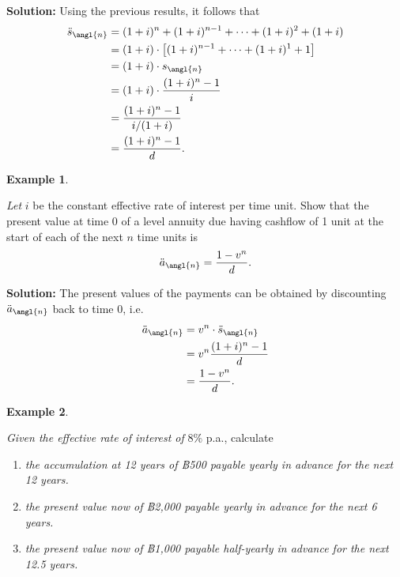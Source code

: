 \documentclass[
]{book}
\theoremstyle{definition}
\theoremstyle{definition}
\newtheorem{example}{Example}[chapter]
\theoremstyle{definition}
\theoremstyle{definition}
\theoremstyle{remark}
\begin{document}
\textbf{Solution:} Using the previous results, it follows that
\[\begin{aligned}
 \ddot{s}_\angl{n} &= (1+i)^n + (1+i)^{n-1} + \cdots + (1+i)^2 + (1+i) \\
            &= (1+i) \cdot \left[(1+i)^{n-1} + \cdots + (1+i)^1 + 1\right] \\
            &= (1+i) \cdot {s}_\angl{n} \\
            &= (1+i) \cdot \frac{(1+i)^n -1 }{i}\\
            &=  \frac{(1+i)^n -1 }{i/(1+i)}\\
            &=  \frac{(1+i)^n -1 }{d}.\end{aligned}\]

\begin{example}
\protect\hypertarget{exm:unlabeled-div-31}{}\label{exm:unlabeled-div-31}

\emph{Let} \(i\) be the constant effective rate of interest per time unit. Show
that the present value at time 0 of a level annuity due having cashflow
of 1 unit at the start of each of the next \(n\) time units is
\[\ddot{a}_\angl{n} =  \frac{1 - v^n }{d}.\]

\end{example}

\textbf{Solution:} The present values of the payments can be obtained by
discounting \(\ddot{a}_\angl{n}\) back to time 0, i.e.~\[\begin{aligned}
 \ddot{a}_\angl{n} &= v^n  \cdot  \ddot{s}_\angl{n} \\
            &= v^n  \frac{(1+i)^n -1 }{d} \\
            &=\frac{1 - v^n}{d}.\end{aligned}\]

\begin{example}
\protect\hypertarget{exm:unlabeled-div-32}{}\label{exm:unlabeled-div-32}

\emph{Given the effective rate of interest of} \(8\%\) p.a., calculate

\begin{enumerate}
\def\labelenumi{\arabic{enumi}.}
\item
  \emph{the accumulation at 12 years of ฿500 payable yearly in advance for
  the next 12 years.}
\item
  \emph{the present value now of ฿2,000 payable yearly in advance for the
  next 6 years.}
\item
  \emph{the present value now of ฿1,000 payable half-yearly in advance for
  the next 12.5 years.}
\end{enumerate}

\end{example}
\end{document}
